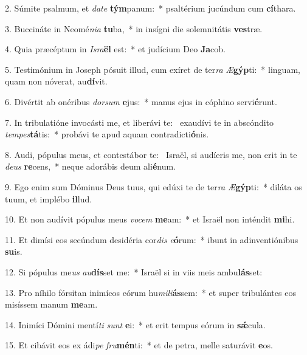 2. Súmite psalmum, et \textit{da}\textit{te} \textbf{tým}panum:~*  psaltérium jucúndum cum \textbf{cí}thara.\

3. Buccináte in Neomé\textit{ni}\textit{a} \textbf{tu}ba,~*  in insígni die solemnitátis \textbf{ves}træ.\

4. Quia præcéptum in \textit{Is}\textit{ra}\textbf{ël} est:~*  et judícium Deo \textbf{Ja}cob.\

5. Testimónium in Joseph pósuit illud, cum exíret de ter\textit{ra} \textit{Æ}\textbf{gýp}ti:~*  linguam, quam non nóverat, au\textbf{dí}vit.\

6. Divértit ab onéribus \textit{dor}\textit{sum} \textbf{e}jus:~*  manus ejus in cóphino servi\textbf{é}runt.\

7. In tribulatióne invocásti me, et liberávi te: \dag\  exaudívi te in abscóndito \textit{tem}\textit{pes}\textbf{tá}tis:~*  probávi te apud aquam contradicti\textbf{ó}nis.\

8. Audi, pópulus meus, et contestábor te: \dag\  Israël, si audíeris me, non erit in te \textit{de}\textit{us} \textbf{re}cens,~*  neque adorábis deum ali\textbf{é}num.\

9. Ego enim sum Dóminus Deus tuus, qui edúxi te de ter\textit{ra} \textit{Æ}\textbf{gýp}ti:~*  diláta os tuum, et implébo \textbf{il}lud.\

10. Et non audívit pópulus meus \textit{vo}\textit{cem} \textbf{me}am:~*  et Israël non inténdit \textbf{mi}hi.\

11. Et dimísi eos secúndum desidéria cor\textit{dis} \textit{e}\textbf{ó}rum:~*  ibunt in adinventiónibus \textbf{su}is.\

12. Si pópulus me\textit{us} \textit{au}\textbf{dís}set me:~*  Israël si in viis meis ambu\textbf{lás}set:\

13. Pro níhilo fórsitan inimícos eórum hu\textit{mi}\textit{li}\textbf{ás}sem:~*  et super tribulántes eos misíssem manum \textbf{me}am.\

14. Inimíci Dómini mentí\textit{ti} \textit{sunt} \textbf{e}i:~*  et erit tempus eórum in \textbf{sǽ}cula.\

15. Et cibávit eos ex ádi\textit{pe} \textit{fru}\textbf{mén}ti:~*  et de petra, melle saturávit \textbf{e}os.\

